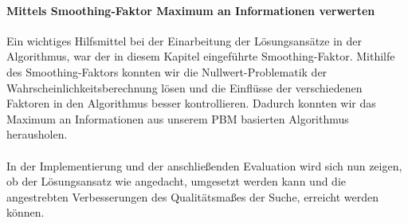 \paragraph{Mittels Smoothing-Faktor Maximum an Informationen verwerten}
Ein wichtiges Hilfsmittel bei der Einarbeitung der Lösungsansätze in der Algorithmus, war der in diesem Kapitel eingeführte Smoothing-Faktor. Mithilfe des Smoothing-Faktors konnten wir die Nullwert-Problematik der Wahrscheinlichkeitsberechnung lösen und die Einflüsse der verschiedenen Faktoren in den Algorithmus besser kontrollieren. Dadurch konnten wir das Maximum an Informationen aus unserem PBM basierten Algorithmus herausholen. 
\\
\\
In der Implementierung und der anschließenden Evaluation wird sich nun zeigen, ob der Lösungsansatz wie angedacht, umgesetzt werden kann und die angestrebten Verbesserungen des Qualitätsmaßes der Suche, erreicht werden können.
